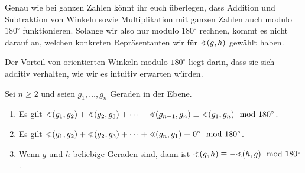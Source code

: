 Genau wie bei ganzen Zahlen könnt ihr euch überlegen, dass Addition und Subtraktion von Winkeln sowie Multiplikation mit ganzen Zahlen auch modulo $180^\circ$ funktionieren. Solange wir also nur modulo $180^\circ$ rechnen, kommt es nicht darauf an, welchen konkreten Repräsentanten wir für $\winkel (g,h)$ gewählt haben.

Der Vorteil von orientierten Winkeln modulo $180^\circ$ liegt darin, dass sie sich additiv verhalten, wie wir es intuitiv erwarten würden.
\begin{satzmitnamen}
	Sei $n\geqslant 2$ und seien $g_1,\dotsc,g_n$ Geraden in der Ebene.
	\begin{enumerate}
		\item Es gilt $\winkel(g_1,g_2) + \winkel(g_2,g_3)+ \dotsb + \winkel(g_{n-1},g_n) \equiv \winkel(g_1,g_n) \mod 180^\circ$.\label{eigenschaft:OrientierteWinkelAdditiv}
		\item Es gilt $\winkel(g_1,g_2) + \winkel(g_2,g_3) + \dotsb + \winkel(g_n,g_1) \equiv 0^\circ  \mod 180^\circ$.\label{eigenschaft:OrientierteWinkelAddierenZuNull}
		\item Wenn $g$ und $h$ beliebige Geraden sind, dann ist $\winkel(g,h) \equiv -\winkel(h,g) \mod 180^\circ$.\label{eigenschaft:OrientierungVorzeichen}
	\end{enumerate}
\end{satzmitnamen}
